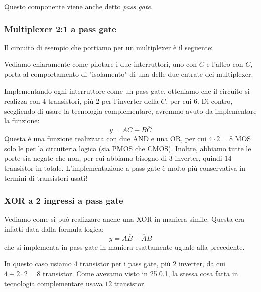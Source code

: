 \documentclass[a4paper,11pt]{article}
\begin{document}
Questo componente viene anche detto \textit{pass gate}.

\subsubsection{Multiplexer 2:1 a pass gate}
Il circuito di esempio che portiamo per un multiplexer è il seguente:
\begin{center}
\end{center}

Vediamo chiaramente come pilotare i due interruttori, uno con $C$ e l'altro con $\overline{C}$, porta al comportamento di "isolamento" di una delle due entrate dei multiplexer.

Implementando ogni interruttore come un pass gate, otteniamo che il circuito si realizza con $4$ transistori, più $2$ per l'inverter della $C$, per cui $6$. Di contro, scegliendo di usare la tecnologia complementare, avremmo avuto da implementare la funzione:
$$
y = AC + B \overline{C}
$$
Questa è una funzione realizzata con due AND e una OR, per cui $4 \cdot 2 = 8$ MOS solo le per la circuiteria logica (sia PMOS che CMOS). Inoltre, abbiamo tutte le porte sia negate che non, per cui abbiamo bisogno di $3$ inverter, quindi $14$ transistor in totale. L'implementazione a pass gate è molto più conservativa in termini di transistori usati! 

\subsubsection{XOR a 2 ingressi a pass gate}
Vediamo come si può realizzare anche una XOR in maniera simile. Questa era infatti data dalla formula logica:
$$
y = A \overline{B} + \overline{A} B
$$
che si implementa in pass gate in maniera esattamente uguale alla precedente.

In questo caso usiamo $4$ transistor per i pass gate, più $2$ inverter, da cui $4 + 2 \cdot 2 = 8$ transistor. Come avevamo visto in 25.0.1, la stessa cosa fatta in tecnologia complementare usava $12$ transistor.
\end{document}
